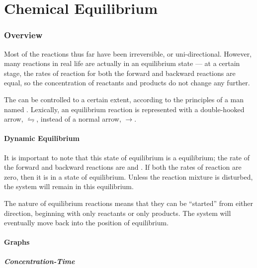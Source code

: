 

\pagebreak
\part{Chemical Equilibrium}

	\section{Overview}

		Most of the reactions thus far have been irreversible, or uni-directional. However, many reactions in real life are actually in an
		equilibrium state --- at a certain stage, the rates of reaction for both the forward and backward reactions are equal, so the
		concentration of reactants and products do not change any further.

		The  can be controlled to a certain extent, according to the principles of a man named
		. Lexically, an equilibrium reaction is represented with a double-hooked arrow, $\leftrightharpoons$, instead of a normal
		arrow, $\longrightarrow$.

		\subsection{Dynamic Equilibrium}

			It is important to note that this state of equilibrium is a  equilibrium; the rate of the forward and backward
			reactions are  and . If both the rates of reaction are zero, then it is in a state of 
			equilibrium. Unless the reaction mixture is disturbed, the system will remain in this equilibrium.

			The nature of equilibrium reactions means that they can be \enquote{started} from either direction, beginning with only reactants or
			only products. The system will eventually move back into the position of equilibrium.


		\pagebreak
		\subsection{Graphs}

			\subsubsection{Concentration-Time}

